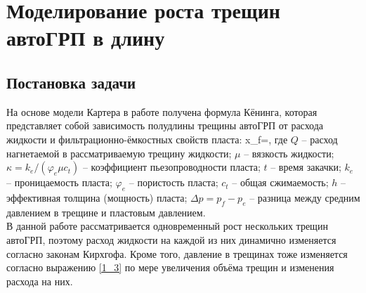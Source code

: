 \chapter{Моделирование роста трещин автоГРП в длину} \label{ch3}

\section{Постановка задачи}

На основе модели Картера \cite{karter} в работе \cite{koning} получена формула Кёнинга, которая представляет собой зависимость полудлины трещины автоГРП от расхода жидкости и фильтрационно-ёмкостных свойств пласта:
\beq\label{2_1}
x_{\!f}=,
\eeq
где $Q$ -- расход нагнетаемой в рассматриваемую трещину жидкости;\newline
$\mu$ -- вязкость жидкости;\newline
$\kappa=k_e/(\varphi_e\mu c_t)$ -- коэффициент пьезопроводности пласта;\newline
$t$ -- время закачки;\newline
$k_e$ -- проницаемость пласта;\newline
$\varphi_e$ -- пористость пласта;\newline
$c_t$ -- общая сжимаемость;\newline
$h$ -- эффективная толщина (мощность) пласта;\newline
$\Delta p=p_{\!f}-p_e$ -- разница между средним давлением в трещине и пластовым давлением.\\

В данной работе рассматривается одновременный рост нескольких трещин автоГРП, поэтому расход жидкости на каждой из них динамично изменяется согласно законам Кирхгофа.
Кроме того, давление в трещинах тоже изменяется согласно выражению \eqref{1_3} по мере увеличения объёма трещин и изменения расхода на них.

